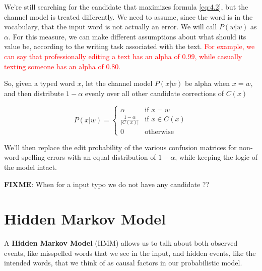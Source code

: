 We're still searching for the candidate that maximizes formula \ref{eq:4.2}, but the channel model is treated 
differently. 
We need to assume, since the word is in the vocabulary, that the input word is not actually an error. We will call 
$P(w|w)$ as $\alpha$. For this measure, we can make different assumptions about what should its value be, 
according to the writing task associated with the text. \textcolor{red}{For example, we can say that 
professionally editing a text has an alpha of $0.99$, while casually texting someone has an alpha of $0.80$.}

So, given a typed word $x$, let the channel model $P(x|w)$ be alpha when $x = w$, and then distribute 
$1-\alpha $ evenly over all other candidate corrections of $C(x)$ 

\begin{equation}\label{eq:4.3}
	P(x|w) = \begin{cases} 
	\alpha & \mbox{if } x = w \\ 
	\frac{1-\alpha}{|C(x)|} & \mbox{if }  x \in C(x) \\
	0 & \mbox{otherwise} 
	\end{cases}
\end{equation}

We'll then replace the edit probability of the various confusion matrices for non-word spelling errors with an 
equal distribution of $1-\alpha$, while keeping the logic of the model intact.

\textbf{FIXME}: When for a input typo we do not have any candidate ?? 


\section{Hidden Markov Model}

A \textbf{Hidden Markov Model} (HMM) allows us to talk about both observed events, like misspelled words that 
we see in the input, and hidden events, like the intended words, that we think of as causal factors in our 
probabilistic model. 

